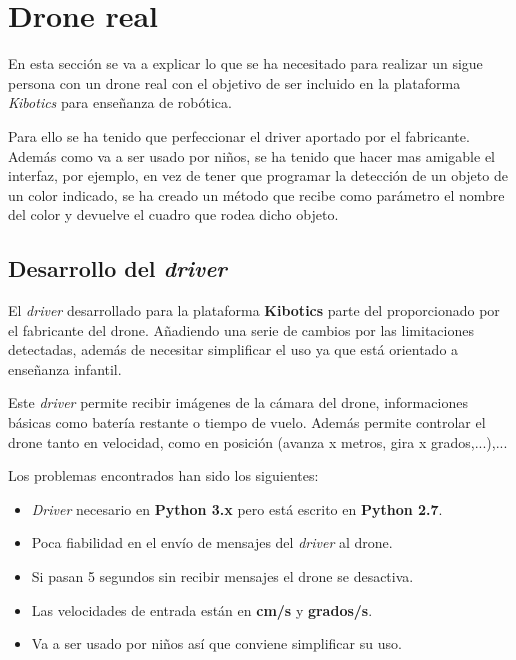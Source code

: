 \chapter{Drone real}\label{cap.clasificacion}
En esta sección se va a explicar lo que se ha necesitado para realizar un sigue persona con un drone real con el objetivo de ser incluido en la plataforma \textit{Kibotics} para enseñanza de robótica.

Para ello se ha tenido que perfeccionar el driver aportado por el fabricante\cite{tellodriver}. Además como va a ser usado por niños, se ha tenido que hacer mas amigable el interfaz, por ejemplo, en vez de tener que programar la detección de un objeto de un color indicado, se ha creado un método que recibe como parámetro el nombre del color y devuelve el cuadro que rodea dicho objeto.

\section{Desarrollo del \textit{driver}}
El \textit{driver} desarrollado para la plataforma \textbf{Kibotics} parte del proporcionado por el fabricante del drone. Añadiendo una serie de cambios por las limitaciones detectadas, además de necesitar simplificar el uso ya que está orientado a enseñanza infantil. 

Este \textit{driver} permite recibir imágenes de la cámara del drone, informaciones básicas como batería restante o tiempo de vuelo. Además permite controlar el drone tanto en velocidad, como en posición (avanza x metros, gira x grados,...),... 

Los problemas encontrados han sido los siguientes:
\begin{itemize}
  \item \textit{Driver} necesario en \textbf{Python 3.x} pero está escrito en \textbf{Python 2.7}. 
  \item Poca fiabilidad en el envío de mensajes del \textit{driver} al drone.
  \item Si pasan 5 segundos sin recibir mensajes el drone se desactiva.
  \item Las velocidades de entrada están en \textbf{cm/s} y \textbf{grados/s}.
  \item Va a ser usado por niños así que conviene simplificar su uso. 
\end{itemize}
